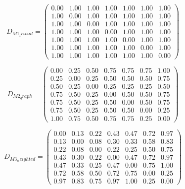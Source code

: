 \begin{table}[htbp]
\caption{Ground Metric Matrices (M1--M5)}
\label{tab:ground-metrics}

\begin{equation}
D_{M1_trivial} = \begin{pmatrix}0.00 & 1.00 & 1.00 & 1.00 & 1.00 & 1.00 & 1.00 \\ 1.00 & 0.00 & 1.00 & 1.00 & 1.00 & 1.00 & 1.00 \\ 1.00 & 1.00 & 0.00 & 1.00 & 1.00 & 1.00 & 1.00 \\ 1.00 & 1.00 & 1.00 & 0.00 & 1.00 & 1.00 & 1.00 \\ 1.00 & 1.00 & 1.00 & 1.00 & 0.00 & 1.00 & 1.00 \\ 1.00 & 1.00 & 1.00 & 1.00 & 1.00 & 0.00 & 1.00 \\ 1.00 & 1.00 & 1.00 & 1.00 & 1.00 & 1.00 & 0.00\end{pmatrix}
\end{equation}

\begin{equation}
D_{M2_graph} = \begin{pmatrix}0.00 & 0.25 & 0.50 & 0.75 & 0.75 & 0.75 & 1.00 \\ 0.25 & 0.00 & 0.25 & 0.50 & 0.50 & 0.50 & 0.75 \\ 0.50 & 0.25 & 0.00 & 0.25 & 0.25 & 0.25 & 0.50 \\ 0.75 & 0.50 & 0.25 & 0.00 & 0.50 & 0.50 & 0.75 \\ 0.75 & 0.50 & 0.25 & 0.50 & 0.00 & 0.50 & 0.75 \\ 0.75 & 0.50 & 0.25 & 0.50 & 0.50 & 0.00 & 0.25 \\ 1.00 & 0.75 & 0.50 & 0.75 & 0.75 & 0.25 & 0.00\end{pmatrix}
\end{equation}

\begin{equation}
D_{M3_weighted} = \begin{pmatrix}0.00 & 0.13 & 0.22 & 0.43 & 0.47 & 0.72 & 0.97 \\ 0.13 & 0.00 & 0.08 & 0.30 & 0.33 & 0.58 & 0.83 \\ 0.22 & 0.08 & 0.00 & 0.22 & 0.25 & 0.50 & 0.75 \\ 0.43 & 0.30 & 0.22 & 0.00 & 0.47 & 0.72 & 0.97 \\ 0.47 & 0.33 & 0.25 & 0.47 & 0.00 & 0.75 & 1.00 \\ 0.72 & 0.58 & 0.50 & 0.72 & 0.75 & 0.00 & 0.25 \\ 0.97 & 0.83 & 0.75 & 0.97 & 1.00 & 0.25 & 0.00\end{pmatrix}
\end{equation}


\end{table}
